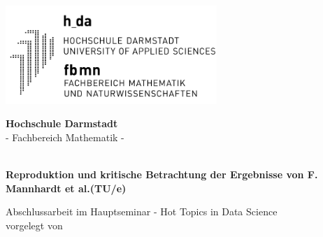 \documentclass[
11pt, %
english,
singlespacing, %
]{MastersDoctoralThesis} %
\author{Lisa Stolz}
\begin{document}
\frontmatter %

\pagestyle{plain} %


\begin{titlepage}
\begin{center}

\vspace*{.06\textheight}
\includegraphics[width=8cm]{Logo/logo_h_da_fbmn300.png}
\vspace*{.02\textheight}

\Large{\textbf{\textsf{Hochschule Darmstadt}}} \\
\Large{\textsf{- Fachbereich Mathematik -}}
\vspace*{.06\textheight}
 
\huge{\textbf{\textsf{\ttitle}}}\\
\vspace{0.5em}
\Large{\textbf{\textsf{Reproduktion und kritische Betrachtung der Ergebnisse von F. Mannhardt et al.(TU/e)}}} \\
 
\vspace{3em}

\large{\textsf{Abschlussarbeit im Hauptseminar - Hot Topics in Data Science}} \\ \vspace{0.5em}
\large{\textsf{vorgelegt von}}
 
\vspace*{.04\textheight}
 
\textsf{\authorname}
 
\vspace{4.0em}

\begin{spacing}{1.5}
\textsf{}            \textsf{\makebox[7cm][r]{\supname}} \\
\textsf{}           \textsf{\makebox[7cm][r]{\examname}} \\
\textsf{\small{}}  \textsf{\small{\makebox[7cm][r]{\today}}} \\
\textsf{\small{}}   \textsf{\small{\makebox[7cm][r]{\today}}}
\end{spacing}

\end{center}
\end{titlepage}
\end{document}
